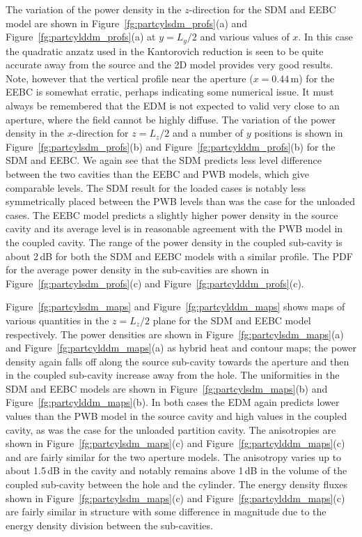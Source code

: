 \documentclass[a4paper]{article}
\numberwithin{equation}{section}
\newcounter{Figure}
\begin{document}
The variation of the power density in the $z$-direction for the SDM and EEBC model are shown in 
Figure~\ref{fg:partcylsdm_profs}(a) and Figure~\ref{fg:partcylddm_profs}(a) at $y=L_y/2$ and various 
values of $x$. In this case the quadratic anzatz used in the Kantorovich reduction
is seen to be quite accurate away from the source and the 2D model provides very good results. Note, however that
the vertical profile near the aperture ($x=0.44$\,m) for the EEBC is somewhat erratic, perhaps indicating 
some numerical issue. It must always be remembered that the EDM is not expected to valid very close to an aperture,
where the field cannot be highly diffuse. The variation of the power density in the $x$-direction for $z=L_z/2$ 
and a number of $y$ positions is shown in Figure~\ref{fg:partcylsdm_profs}(b) and 
Figure~\ref{fg:partcylddm_profs}(b) for the SDM and EEBC. We again see that the SDM predicts less level difference
between the two cavities than the EEBC and PWB models, which give comparable levels. The SDM result for the loaded
cases is notably less symmetrically placed between the PWB levels than was the case for the unloaded cases. 
The EEBC model predicts a slightly higher power density in the source cavity and its average level is in reasonable
agreement with the PWB model in the coupled cavity. The range of the power density in the coupled sub-cavity is
about 2\,dB for both the SDM and EEBC models with a similar profile. The PDF for the average power density in 
the sub-cavities are shown in Figure~\ref{fg:partcylsdm_profs}(c) and Figure~\ref{fg:partcylddm_profs}(c).

Figure~\ref{fg:partcylsdm_maps} and Figure~\ref{fg:partcylddm_maps} shows maps of various quantities in 
the $z=L_z/2$ plane for the SDM and EEBC model respectively. The power densities are shown in 
Figure~\ref{fg:partcylsdm_maps}(a) and Figure~\ref{fg:partcylddm_maps}(a) as hybrid heat and contour maps; 
the power density again falls off along the source sub-cavity towards the aperture and then in the coupled
sub-cavity increase away from the hole. The uniformities in the SDM and EEBC models are shown in 
Figure~\ref{fg:partcylsdm_maps}(b) and Figure~\ref{fg:partcylddm_maps}(b). In both cases the EDM again
predicts lower values than the PWB model in the source cavity and high values in the coupled cavity, as was
the case for the unloaded partition cavity. The anisotropies are shown in Figure~\ref{fg:partcylsdm_maps}(c) and
Figure~\ref{fg:partcylddm_maps}(c) and are fairly similar for the two aperture models. The anisotropy varies up to
about 1.5\,dB in the cavity and notably remains above 1\,dB in the volume of the coupled sub-cavity between the 
hole and the cylinder. The energy density fluxes shown in Figure~\ref{fg:partcylsdm_maps}(c) and 
Figure~\ref{fg:partcylddm_maps}(c) are fairly similar in structure with some difference in magnitude due to the 
energy density division between the sub-cavities.
\end{document}
